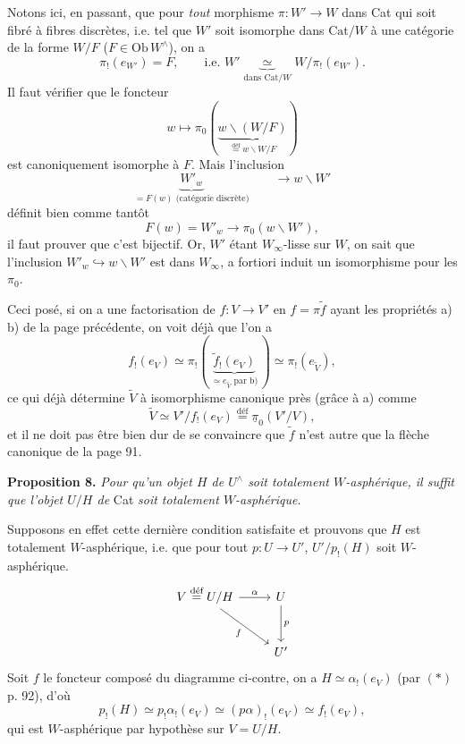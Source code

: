 \documentclass[11pt]{article}
\newcommand{\printedpage}[1]{\marginpar{\footnotesize p.~#1}}
\newcommand{\msp}[1]{\marginpar{\footnotesize [#1]}}
\newcommand{\defeq}{\overset{\text{déf}}{=}}
\newcommand{\upi}{\underline{\pi}}
\newcommand{\Cat}{\mathrm{Cat}}
\newcommand{\Ob}{\mathrm{Ob}\,}
\begin{document}
Notons ici, en passant, que pour \textit{tout} morphisme $\pi : W' \longrightarrow W$ dans Cat qui soit fibré à fibres discrètes, i.e. tel que $W'$ soit isomorphe dans $\Cat/W$ à une catégorie de la forme $W/F$ ($F \in \Ob W^{\wedge}$), on a
\[ \pi_!(e_{W'}) = F, \qquad \text{i.e. } W' \underbrace{\ \simeq\ }_{\text{dans } \Cat/W} W/\pi_!(e_{W'}). \tag*{$(*)$} \]
Il faut vérifier que le foncteur
\[ w \longmapsto \pi_0(\underbrace{w\backslash(W/F)}_{\defeq w\backslash W/F}) \]
est canoniquement isomorphe à $F$. Mais l'inclusion
\[ \underbrace{W'_w}_{= F(w) \text{ (catégorie discrète)}} \qquad \longrightarrow w\backslash W' \]
\msp{page 93}
définit bien comme tantôt
\[ F(w) = W'_w \longrightarrow \pi_0(w\backslash W'), \]
il faut prouver que c'est bijectif. Or, $W'$ étant $W_\infty$-lisse sur $W$, on sait que l'inclusion $W'_w \hookrightarrow w\backslash W'$ est dans $W_\infty$, a fortiori induit un isomorphisme pour les $\pi_0$.

Ceci posé, si on a une factorisation de $f : V \longrightarrow V'$ en $f = \pi\tilde{f}$ ayant les propriétés a) b) de la page précédente, on voit déjà que l'on a
\[ f_!(e_V) \simeq \pi_!(\, \underbrace{\tilde{f}_!(e_V)}_{\simeq e_{\tilde{V}} \text{ par b)}} \,) \simeq \pi_!(e_{\tilde{V}}), \]
ce qui déjà détermine $\tilde{V}$ à isomorphisme canonique près (grâce à a) comme
\[ \tilde{V} \simeq V'/f_!(e_V) \defeq \upi_0(V'/V), \] %
\printedpage{66}
et il ne doit pas être bien dur de se convaincre que $\tilde{f}$ n'est autre que la flèche canonique de la page 91.

\textbf{Proposition 8.} \textit{Pour qu'un objet $H$ de $U^{\wedge}$ soit totalement $W$-asphérique, il suffit que l'objet $U/H$ de} Cat \textit{soit totalement $W$-asphérique.}

\msp{page 94}
Supposons en effet cette dernière condition satisfaite et prouvons que $H$ est totalement $W$-asphérique, i.e. que pour tout $p : U \longrightarrow U'$, $U'/p_!(H)$ soit $W$-asphérique.
\[
\begin{tikzcd}[row sep=large]
V \defeq U/H \arrow[r, "\alpha"] \arrow[dr, "f"'] & U \arrow[d, "p"] \\
 & U'
\end{tikzcd}
\]
Soit $f$ le foncteur composé du diagramme ci-contre, on a $H \simeq \alpha_!(e_V)$ (par $(*)$ p. 92), d'où
\[ p_!(H) \simeq p_!\alpha_!(e_V) \simeq (p\alpha)_!(e_V) \simeq f_!(e_V), \]
qui est $W$-asphérique par hypothèse sur $V = U/H$.
\end{document}
